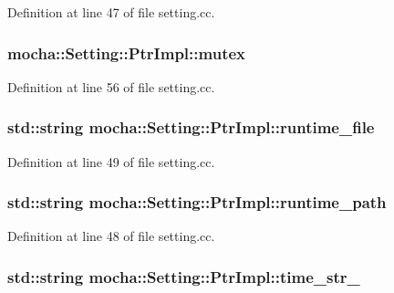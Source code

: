 Definition at line 47 of file setting.cc.

\hypertarget{classmocha_1_1_setting_1_1_ptr_impl_a1ebc25302cae41a711f6197aa09a79f9}{
\subsubsection[{mutex}]{ {\bf mocha::Setting::PtrImpl::mutex}}}
\label{classmocha_1_1_setting_1_1_ptr_impl_a1ebc25302cae41a711f6197aa09a79f9}


Definition at line 56 of file setting.cc.

\hypertarget{classmocha_1_1_setting_1_1_ptr_impl_a103e94005df3c27317024aa749bdf484}{
\subsubsection[{runtime\_\-file}]{\setlength{\rightskip}{0pt plus 5cm}std::string {\bf mocha::Setting::PtrImpl::runtime\_\-file}}}
\label{classmocha_1_1_setting_1_1_ptr_impl_a103e94005df3c27317024aa749bdf484}


Definition at line 49 of file setting.cc.

\hypertarget{classmocha_1_1_setting_1_1_ptr_impl_a10a54f3e368e263c56d7c804fffd110c}{
\subsubsection[{runtime\_\-path}]{\setlength{\rightskip}{0pt plus 5cm}std::string {\bf mocha::Setting::PtrImpl::runtime\_\-path}}}
\label{classmocha_1_1_setting_1_1_ptr_impl_a10a54f3e368e263c56d7c804fffd110c}


Definition at line 48 of file setting.cc.

\hypertarget{classmocha_1_1_setting_1_1_ptr_impl_a23c40fb9cc32d08108bff2d45f9d051c}{
\subsubsection[{time\_\-str\_\-}]{\setlength{\rightskip}{0pt plus 5cm}std::string {\bf mocha::Setting::PtrImpl::time\_\-str\_\-}}}
\label{classmocha_1_1_setting_1_1_ptr_impl_a23c40fb9cc32d08108bff2d45f9d051c}


